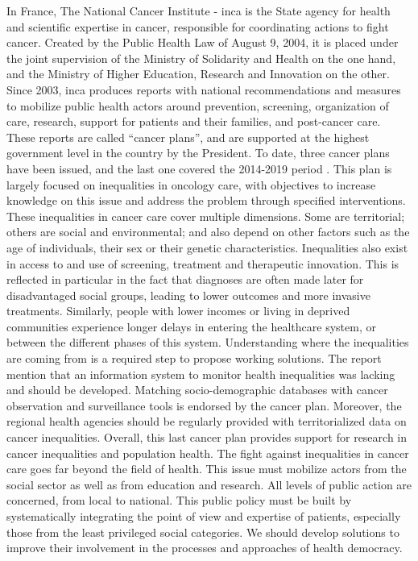 In France, The National Cancer Institute - \acf{inca} is the State agency for
health and scientific expertise in cancer, responsible for coordinating actions
to fight cancer. Created by the Public Health Law of August 9, 2004, it is
placed under the joint supervision of the Ministry of Solidarity and Health on
the one hand, and the Ministry of Higher Education, Research and Innovation on
the other. Since 2003, \acs{inca} produces reports with national recommendations
and measures to mobilize public health actors around prevention, screening,
organization of care, research, support for patients and their families, and
post-cancer care. These reports are called ``cancer plans'', and are supported
at the highest government level in the country by the President. To date, three
cancer plans have been issued, and the last one covered the 2014-2019 period
\cite{buzyn_plan_2014}. This plan is largely focused on inequalities in oncology
care, with objectives to increase knowledge on this issue and address the
problem through specified interventions. These inequalities in cancer care cover
multiple dimensions. Some are territorial; others are social and environmental;
and also depend on other factors such as the age of individuals, their sex or
their genetic characteristics. Inequalities also exist in access to and use of
screening, treatment and therapeutic innovation. This is reflected in particular
in the fact that diagnoses are often made later for disadvantaged social groups,
leading to lower outcomes and more invasive treatments. Similarly, people with
lower incomes or living in deprived communities experience longer delays in
entering the healthcare system, or between the different phases of this system.
Understanding where the inequalities are coming from is a required step to
propose working solutions. The report mention that an information system to
monitor health inequalities was lacking and should be developed. Matching
socio-demographic databases with cancer observation and surveillance tools is
endorsed by the cancer plan. Moreover, the regional health agencies should be
regularly provided with territorialized data on cancer inequalities. Overall,
this last cancer plan provides support for research in cancer inequalities and
population health. The fight against inequalities in cancer care goes far beyond
the field of health. This issue must mobilize actors from the social sector as
well as from education and research. All levels of public action are concerned,
from local to national. This public policy must be built by systematically
integrating the point of view and expertise of patients, especially those from
the least privileged social categories. We should develop solutions to improve
their involvement in the processes and approaches of health democracy.


